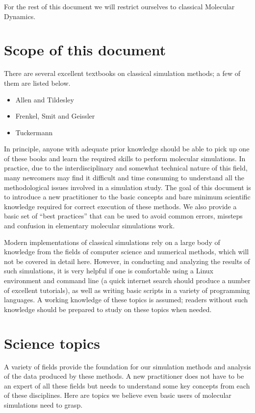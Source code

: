 \documentclass[9pt,bestpractices]{livecoms}
\begin{document}
For the rest of this document we will restrict ourselves to classical Molecular Dynamics.

\section{Scope of this document}
There are several excellent textbooks on classical simulation methods; a few of them are listed below.

\begin{itemize}
\item Allen and Tildesley
\item Frenkel, Smit and Geissler
\item Tuckermann
\end{itemize}

In principle, anyone with adequate prior knowledge should be able to pick up one of these books and learn the required skills to perform molecular simulations. In practice, due to the interdisciplinary and somewhat technical nature of this field, many newcomers may find it difficult and time consuming to understand all the methodological issues involved in a simulation study.   The goal of this document is to introduce a new practitioner to the basic concepts and bare minimum scientific knowledge required for correct execution of these methods. We also provide a basic set of ``best practices'' that can be used to avoid common errors, missteps and confusion in elementary molecular simulations work.

Modern implementations of classical simulations rely on a large body of knowledge from the fields of computer science and numerical methods, which will not be covered in detail here. However, in conducting and analyzing the results of such simulations, it is very helpful if one is comfortable using a Linux environment and command line (a quick internet search should produce a number of excellent tutorials), as well as writing basic scripts in a variety of programming languages. A working knowledge of these topics is assumed; readers without such knowledge should be prepared to study on these topics when needed.



\section{Science topics}
A variety of fields provide the foundation for our simulation methods and analysis of the data produced by these methods. A new practitioner does not have to be an expert of all these fields but needs to understand some key concepts from each of these disciplines. Here are topics we believe even basic users of molecular simulations need to grasp.
\end{document}
